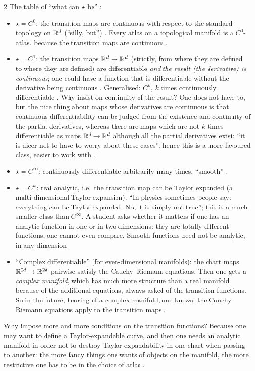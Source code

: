 \begin{paracol}{2}
The table of ``what can $\star$ be'' :
\begin{itemize}
  \item $\star=C^0$: the transition maps are continuous with respect to the standard topology on $\mathbb{R}^d$ (``silly, but'') . Every atlas on a topological manifold is a $C^0$-atlas, because the transition maps are continuous .
  \item $\star=C^1$: the transition maps $\mathbb{R}^d\to\mathbb{R}^d$ (strictly, from where they are defined to where they are defined) are differentiable \emph{and the result (the derivative) is continuous}; one could have a function that is differentiable without the derivative being continuous .
        Generalised: $C^k$, $k$ times continuously differentiable .
        Why insist on continuity of the result? One does not have to, but the nice thing about maps whose derivatives are continuous is that continuous differentiability can be judged from the existence and continuity of the partial derivatives, whereas there are maps which are not $k$ times differentiable as maps $\mathbb{R}^d\to\mathbb{R}^d$ although all the partial derivatives exist;
        ``it is nicer not to have to worry about these cases'', hence this is a more favoured class, easier to work with .
  \item $\star=C^\infty$: continuously differentiable arbitrarily many times, ``smooth'' .
  \item $\star=C^\omega$: real analytic, i.e.\ the transition map can be Taylor expanded (a multi-dimensional Taylor expansion). ``In physics sometimes people say: everything can be Taylor expanded. No, it is simply not true''; this is a much smaller class than $C^\infty$.
        A student asks whether it matters if one has an analytic function in one or in two dimensions: they are totally different functions, one cannot even compare. Smooth functions need not be analytic, in any dimension .
  \item ``Complex differentiable'' (for even-dimensional manifolds): the chart maps $\mathbb{R}^{2d}\to\mathbb{R}^{2d}$ pairwise satisfy the Cauchy--Riemann equations. Then one gets a \emph{complex manifold}, which has much more structure than a real manifold because of the additional equations, always asked of the transition functions. So in the future, hearing of a
        complex manifold, one knows: the Cauchy--Riemann equations apply to the transition maps .
\end{itemize}
Why impose more and more conditions on the transition functions? Because one may want to define a Taylor-expandable curve, and then one needs an analytic manifold in order not to destroy Taylor-expandability in one chart when passing to another: the more fancy things one wants of objects on the manifold, the more restrictive one has to be in the choice of atlas
.


\end{paracol}
